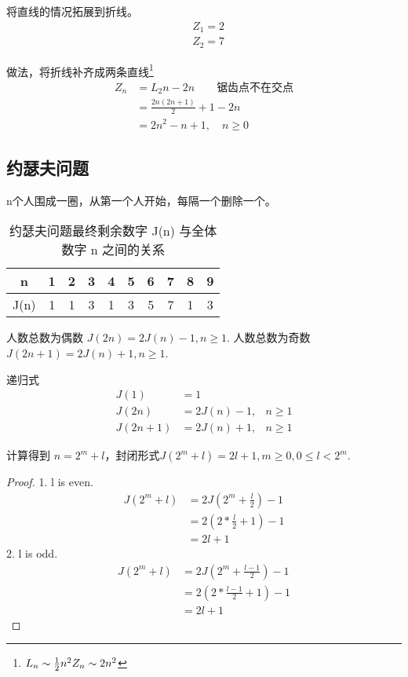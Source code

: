 \documentclass[mode=geye]{elegantnote}
\begin{document}
\begin{remark}
	将直线的情况拓展到折线。
	\begin{align*}
		&Z_1 = 2\\
		&Z_2 = 7
	\end{align*}
\end{remark}
做法，将折线补齐成两条直线\footnote{$ L_n \sim \frac{1}{2}n^2\\ Z_n \sim 2n^2 $}
\begin{align*}
	Z_n& = L_2n-2n \qquad\text{锯齿点不在交点}\\
	&=\frac{2n(2n+1)}{2}+1 - 2n\\
	&=2n^2-n+1, \quad n\geqslant 0
\end{align*}

\subsection{约瑟夫问题}
n个人围成一圈，从第一个人开始，每隔一个删除一个。

\begin{table}[htbp]
	\centering
	\small
	\caption{约瑟夫问题最终剩余数字 J(n) 与全体数字 n 之间的关系}
	\begin{tabular}{c|ccccccccc}
		\toprule
		n & 1 & 2 & 3 & 4 & 5 & 6 & 7 & 8 & 9 \\  
		\midrule
		J(n) & 1 & 1 & 3 & 1 & 3 & 5 & 7 & 1 & 3\\
		\bottomrule
	\end{tabular}%
	\label{tab:reg}%
\end{table}%

人数总数为偶数 $ J(2n)   = 2J(n)-1, n\geqslant 1 $.
人数总数为奇数 $ J(2n+1) = 2J(n)+1, n\geqslant 1 $.

递归式
\begin{align*}
	J(1)  &= 1&\\
	J(2n) &= 2J(n)-1,&  n\geqslant 1 \\
	J(2n+1) &= 2J(n)+1,&  n\geqslant 1 
\end{align*}

计算得到 $ n = 2^m+l $，封闭形式$ J(2^m+l) = 2l+1, m\geqslant 0, 0\leqslant l <2^m  $.
\begin{proof}
	1. l is even.
	\begin{align*}
		J(2^m+l) &= 2J(2^m+\frac{l}{2})-1\\
		&=2(2*\frac{l}{2}+1)-1\\
		&=2l+1
	\end{align*}
	2. l is odd.
	\begin{align*}
		J(2^m+l) &= 2J(2^m+\frac{l-1}{2})-1\\
		&=2(2*\frac{l-1}{2}+1)-1\\
		&=2l+1
	\end{align*}
\end{proof}
\end{document}

